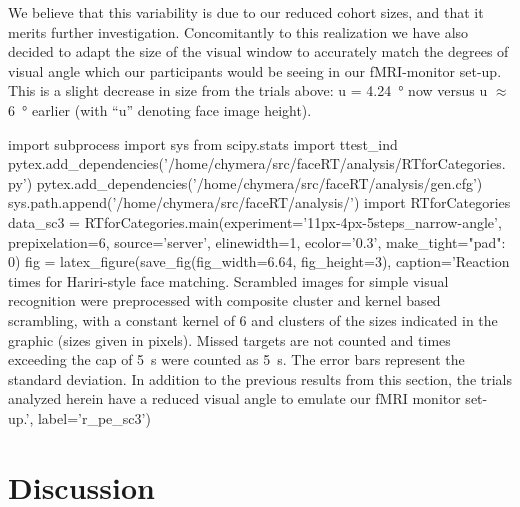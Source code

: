 	    We believe that this variability is due to our reduced cohort sizes, and that it merits further investigation.
	    Concomitantly to this realization we have also decided to adapt the size of the visual window to accurately match the degrees of visual angle which our participants would be seeing in our fMRI-monitor set-up. This is a slight decrease in size from the trials above: u = \SI{4.24}{\degree} now versus u $\approx$ \SI{6}{\degree} earlier (with “u” denoting face image height).	    
	    \begin{pycode}
		import subprocess
		import sys
		from scipy.stats import ttest_ind
		pytex.add_dependencies('/home/chymera/src/faceRT/analysis/RTforCategories.py')
		pytex.add_dependencies('/home/chymera/src/faceRT/analysis/gen.cfg')
		sys.path.append('/home/chymera/src/faceRT/analysis/')
		import RTforCategories
		data_sc3 = RTforCategories.main(experiment='11px-4px-5steps_narrow-angle', prepixelation=6, source='server', elinewidth=1, ecolor='0.3', make_tight={"pad": 0})
		fig = latex_figure(save_fig(fig_width=6.64, fig_height=3), caption='Reaction times for Hariri-style face matching. Scrambled images for simple visual recognition were preprocessed with composite cluster and kernel based scrambling, with a constant kernel of \SI{6}{\pixel} and clusters of the sizes indicated in the graphic (sizes given in pixels). Missed targets are not counted and times exceeding the cap of \SI{5}{\second} were counted as \SI{5}{\second}. The error bars represent the standard deviation. In addition to the previous results from this section, the trials analyzed herein have a reduced visual angle to emulate our fMRI monitor set-up.', label='r_pe_sc3')
	    \end{pycode}
\chapter{Discussion}
